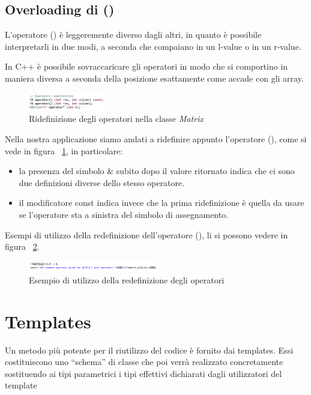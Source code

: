 \subsection{Overloading di ()}
L'operatore () è leggeremente diverso dagli altri, in quanto è possibile interpretarli in due modi, a seconda che compaiano in un l-value o in un r-value.

In C++ è possibile sovraccaricare gli operatori in modo che si comportino in maniera diversa a seconda della posizione esattamente come accade con gli array.

\begin{figure}[h]
	\centering
	\includegraphics[width=0.3\textwidth]{Immagini/MatrixOperatorsRedef.png}
	\caption{Ridefinizione degli operatori nella classe \textit{Matrix}}
	\label{fig:MatrixOperatorRedef}
\end{figure}

Nella nostra applicazione siamo andati a ridefinire appunto l'operatore (), come si vede in figura ~\ref{fig:MatrixOperatorRedef}, in particolare:
\begin{itemize}
	\item  la presenza del simbolo $\&$ subito dopo il valore ritornato indica che ci sono due definizioni diverse dello stesso operatore.
	\item il modificatore const indica invece che la prima ridefinizione è quella da usare se l'operatore sta a sinistra del simbolo di assegnamento.
\end{itemize}
Esempi di utilizzo della redefinizione dell'operatore (), li si possono vedere in figura ~\ref{fig:OperatorExamples}.

\begin{figure}[h]
	\centering
	\includegraphics[width=0.5\textwidth]{Immagini/OperatorExample.png}
	\caption{Esempio di utilizzo della redefinizione degli operatori}
	\label{fig:OperatorExamples}
\end{figure}

\section{Templates}
Un metodo più potente per il riutilizzo del codice è fornito dai templates. Essi costituiscono
uno “schema” di classe che poi verrà realizzato concretamente sostituendo ai tipi parametrici i
tipi effettivi dichiarati dagli utilizzatori del template

